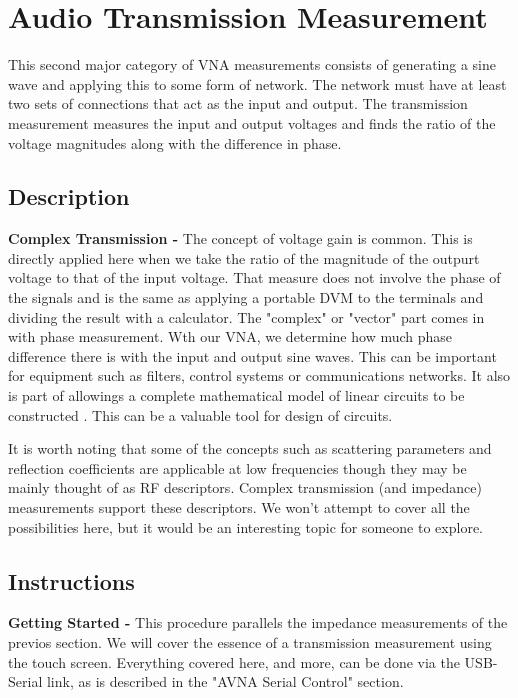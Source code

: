 \section{Audio Transmission Measurement}
This second major category of VNA measurements consists of generating a sine wave and applying this to some form of network.
 The network must have at least two sets of connections that act as the input and output.
The transmission measurement measures the input and output voltages and finds the ratio of the voltage magnitudes along with the difference in phase.
%
\subsection{Description}
\textbf{Complex Transmission - }The concept of voltage gain  is common.
This is directly applied here when we take the ratio of the magnitude of the outpurt voltage to that of the input voltage.
That measure does not involve the phase of the signals and is the same as applying a portable DVM to the terminals and dividing the result with a calculator.
The "complex" or "vector" part comes in with phase measurement.
Wth our VNA, we determine how much phase difference there is with the input and output sine waves.
This can be important for equipment such as  filters, control systems or communications networks.
It also is part of allowings a complete mathematical model of linear circuits to be constructed .  This can be a valuable tool for design of circuits.

It is worth noting that some of the concepts such as scattering parameters and reflection coefficients are applicable at low frequencies though they may be mainly thought of as RF descriptors.  Complex transmission (and impedance) measurements support these descriptors.  We won't attempt to cover all the possibilities here, but it would be an interesting topic for someone to explore.


\subsection{Instructions}
\textbf{Getting Started - }This procedure parallels the impedance measurements of the previos section.  We will cover the essence of a transmission measurement using the touch screen.
Everything covered here, and more, can be done via the USB-Serial link, as is described in the "AVNA Serial Control" section.

